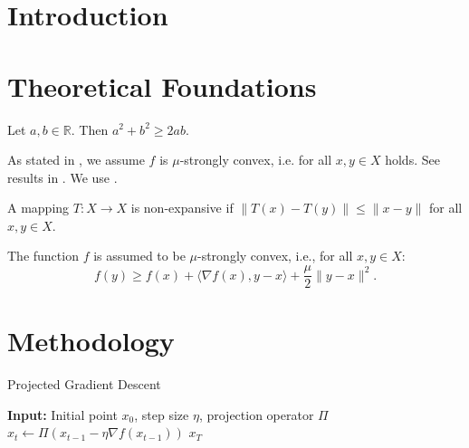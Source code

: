 \documentclass[11pt]{article}
\begin{document}
\begin{mainpart}

  \section*{Introduction}
  \lipsum[2]

  \section*{Theoretical Foundations}
  \lipsum[10]

  \begin{theorem}
  Let \( a, b \in \mathbb{R} \). Then \( a^2 + b^2 \geq 2ab \).
  \end{theorem}

  As stated in , we assume $f$ is $\mu$-strongly convex, i.e. for all \( x, y \in X \)  holds. See results in . We use .

  \lipsum[11]
\columnbreak
  \begin{definition}
  A mapping \( T: X \to X \) is non-expansive if \( \|T(x) - T(y)\| \leq \|x - y\| \) for all \( x, y \in X \).
  \end{definition}

  \begin{assumption}\label{assumption:strong_convexity}
  The function \(f\) is assumed to be $\mu$-strongly convex, i.e., for all \( x, y \in X \):
  \begin{equation}\label{eq:strong_convexity}
  f(y) \geq f(x) + \langle \nabla f(x), y - x \rangle + \frac{\mu}{2} \|y - x\|^2.
  \end{equation}
  \end{assumption}


  \section*{Methodology}
  \lipsum[3]

  \begin{algorithm}{Projected Gradient Descent}\label{algo:proj_gd}
  \begin{algorithmic}[1]
  \State \textbf{Input:} Initial point \( x_0 \), step size \( \eta \), projection operator \( \Pi \)
    \State \( x_t \gets \Pi(x_{t-1} - \eta \nabla f(x_{t-1})) \)
  \EndFor
  \State \Return \( x_T \)
  \end{algorithmic}
  \end{algorithm}
\columnbreak

\end{mainpart}
\end{document}
